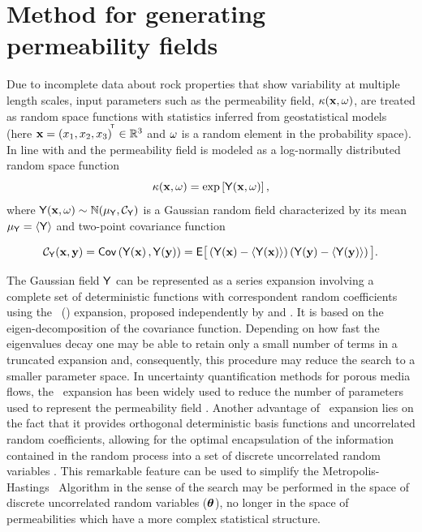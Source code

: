 \section{Method for generating permeability fields }

Due to incomplete data about rock properties that show variability at multiple length scales, input parameters such as the permeability field, $\kappa(\mathbf{x},\omega)$, are treated as random space functions with statistics inferred from geostatistical models (here $\mathbf{x} =\left( x_{1},x_{2},x_{3}  \right)^{\! ^{\mathsf{T}}}\in \mathbb{R}^{3}$ and $\omega$ is a random element in the probability space).
In line with \cite{dagan89} and \cite{gelhar93} the permeability field is modeled as a log-normally distributed random space function
%
\begin{equation}
  \kappa\!\left(\mathbf{x},\omega\right) = \mbox{exp}\left[\mathsf{Y}\!\left(\mathbf{x},\omega\right)\right],
\label{field}
\end{equation}
%
\noindent where $\mathsf{Y}\!\left(\mathbf{x},\omega\right) \sim \mathbb{N}({\mu_{\mathsf{Y}}},\mathcal{C}_{\mathsf{Y}})$ is a Gaussian random field
characterized by its mean ${\mu_{\mathsf{Y}}} = \langle {\mathsf{Y}} \rangle$ and two-point covariance function

\begin{equation}
 \mathcal{C}_{\mathsf{Y}}(\mathbf{x}, \mathbf{y}) = \mathsf{Cov}\left( \mathsf{Y}\!\left(\mathbf{x}\right), \mathsf{Y}\!\left(\mathbf{y}\right) \right) = \mathsf{E}\big[ \left( \mathsf{Y}\!\left(\mathbf{x}\right) - \langle {\mathsf{Y}\!\left(\mathbf{x}\right)} \rangle  \right) \left( \mathsf{Y}\!\left(\mathbf{y}\right) - \langle {\mathsf{Y}\!\left(\mathbf{y}\right)} \rangle  \right) \big].
 \label{covg}
\end{equation}
%

The Gaussian field $\mathsf{Y}$ can be represented as a series expansion involving a complete set of deterministic functions with correspondent random coefficients using the \KL\ (\kl)
expansion, proposed independently by \cite{karhunen46} and \cite{loeve55}. 
It is based on the eigen-decomposition of the covariance function.
Depending on how fast the eigenvalues decay one may be able to  retain only a small number of terms in a truncated expansion and, consequently, this procedure may reduce the search to a smaller parameter space.
In uncertainty quantification methods for porous media flows, the \kl\ expansion has been widely used to reduce the number of parameters used to represent the permeability field
\citep{efendiev05,efendiev2006,das10,mondal10,ginting11,ginting12}.
Another advantage of \kl\ expansion lies on the fact that it provides orthogonal deterministic basis functions and uncorrelated random coefficients, allowing for the optimal encapsulation of the information contained in the random process into a set of discrete uncorrelated random variables \citep{GhanemSpanos}. 
This remarkable feature can be used to simplify the Metropolis-Hastings \mcmc\
Algorithm in the sense of the search may be performed in the space of discrete uncorrelated
random variables ($\boldsymbol{\theta}$), no longer in the space of permeabilities which have a more complex statistical structure.

